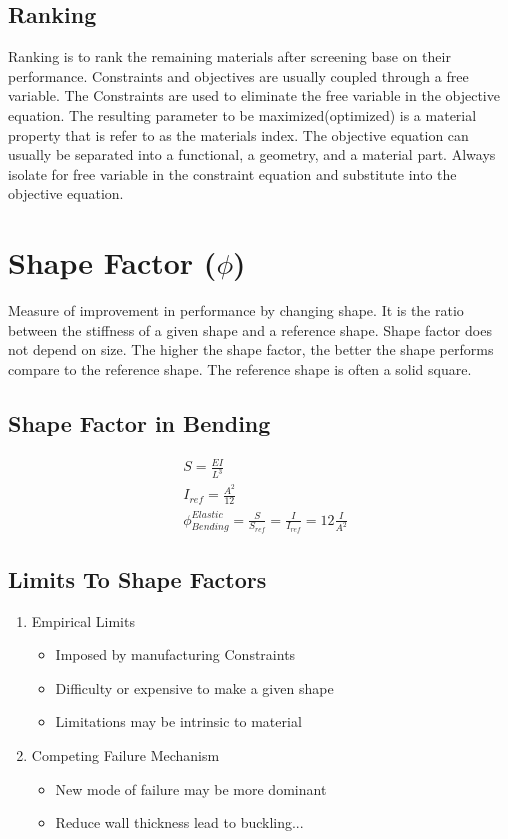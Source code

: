 \documentclass{article}
\begin{document}
    \subsection*{Ranking}
        Ranking is to rank the remaining materials after screening base on their performance.
        Constraints and objectives are usually coupled through a free variable. The Constraints
        are used to eliminate the free variable in the objective equation. The resulting parameter 
        to be maximized(optimized) is a material property that is refer to as the materials index. The 
        objective equation can usually be separated into a functional, a geometry, and a material part.
        Always isolate for free variable in the constraint equation and substitute into the objective equation.


    \section*{Shape Factor ($\phi$)}
    Measure of improvement in performance by changing shape. It is the ratio between the stiffness
    of a given shape and a reference shape. Shape factor does not depend on size. The higher the shape
    factor, the better the shape performs compare to the reference shape. The reference shape is often a 
    solid square.

    \subsection*{Shape Factor in Bending}
    \begin{align*}
        &S = \frac{EI}{L^{3}}\\
        &I_{ref} = \frac{A^{2}}{12}\\
        &\phi^{Elastic}_{Bending} = \frac{S}{S_{ref}} = \frac{I}{I_{ref}} = 12\frac{I}{A^{2}}
    \end{align*}

    \subsection*{Limits To Shape Factors}
    \begin{enumerate}
        \item Empirical Limits
            \begin{itemize}
                \item Imposed by manufacturing Constraints
                \item Difficulty or expensive to make a given shape
                \item Limitations may be intrinsic to material
            \end{itemize}
        \item Competing Failure Mechanism
            \begin{itemize}
                \item New mode of failure may be more dominant
                \item Reduce wall thickness lead to buckling...
            \end{itemize}
    \end{enumerate}
\end{document}
